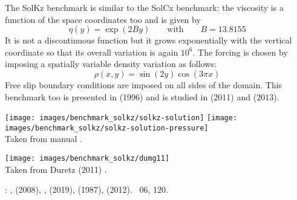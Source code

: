 

The SolKz benchmark is similar to the SolCx benchmark: 
the viscosity is a function of the space coordinates too and is given by 
\[
\eta(y)=\exp(2By) \qquad \text{with} \qquad B=13.8155
\]
It is not a discontinuous function but it grows exponentially with the 
vertical coordinate so that its overall variation is again $10^6$. 
The forcing is chosen by imposing a spatially variable density variation as follows:
\[
\rho(x,y)=\sin(2y) \cos(3\pi x)
\]
Free slip boundary conditions are imposed on all sides of the domain.
This benchmark too is presented in \textcite{zhon96} (1996) 
and is studied in \textcite{dumg11} (2011) and \textcite{gemd13} (2013).

\begin{center}
\texttt{[image: images/benchmark\_solkz/solkz-solution]}
\texttt{[image: images/benchmark\_solkz/solkz-solution-pressure]}\\
{\captionfont Taken from \aspect manual \cite{aspectmanual}.}
\end{center}


\begin{center}
\texttt{[image: images/benchmark\_solkz/dumg11]}\\
{\captionfont Taken from Duretz \etal (2011) \cite{dumg11}.}
\end{center}

\Literature: \textcite{mozg96}, \textcite{mamo08} (2008), 
\cite{vemmXX}, 
\textcite{demh19} (2019), 
\textcite{repa87} (1987),
\textcite{krhb12} (2012).
\stone~06, 120.
